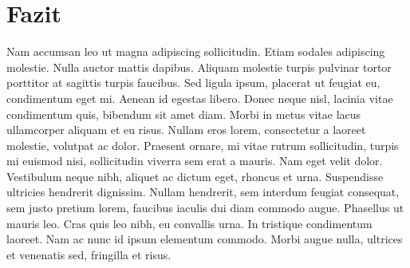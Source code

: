 \chapter{Fazit}

  Nam accumsan leo ut magna adipiscing sollicitudin. Etiam sodales adipiscing molestie. Nulla auctor mattis dapibus. Aliquam molestie turpis pulvinar tortor porttitor at sagittis turpis faucibus. Sed ligula ipsum, placerat ut feugiat eu, condimentum eget mi. Aenean id egestas libero. Donec neque nisl, lacinia vitae condimentum quis, bibendum sit amet diam. Morbi in metus vitae lacus ullamcorper aliquam et eu risus. Nullam eros lorem, consectetur a laoreet molestie, volutpat ac dolor. Praesent ornare, mi vitae rutrum sollicitudin, turpis mi euismod nisi, sollicitudin viverra sem erat a mauris. Nam eget velit dolor. Vestibulum neque nibh, aliquet ac dictum eget, rhoncus et urna. Suspendisse ultricies hendrerit dignissim. Nullam hendrerit, sem interdum feugiat consequat, sem justo pretium lorem, faucibus iaculis dui diam commodo augue. Phasellus ut mauris leo. Cras quis leo nibh, eu convallis urna. In tristique condimentum laoreet. Nam ac nunc id ipsum elementum commodo. Morbi augue nulla, ultrices et venenatis sed, fringilla et risus.

